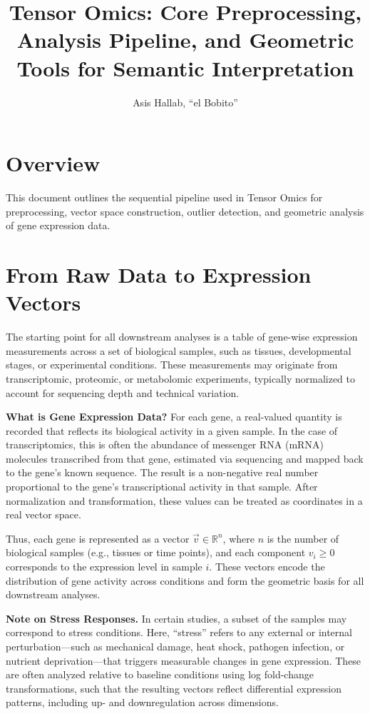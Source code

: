\documentclass{article}
\title{Tensor Omics: Core Preprocessing, Analysis Pipeline, and Geometric Tools
  for Semantic Interpretation}
\author{Asis Hallab, ``el Bobito''}
\begin{document}
\maketitle

\section{Overview}
This document outlines the sequential pipeline used in Tensor Omics for preprocessing, vector space construction, outlier detection, and geometric analysis of gene expression data.

\section{From Raw Data to Expression Vectors}

The starting point for all downstream analyses is a table of gene-wise expression measurements across a set of biological samples, such as tissues, developmental stages, or experimental conditions. These measurements may originate from transcriptomic, proteomic, or metabolomic experiments, typically normalized to account for sequencing depth and technical variation.

\noindent\textbf{What is Gene Expression Data?} For each gene, a real-valued quantity is recorded that reflects its biological activity in a given sample. In the case of transcriptomics, this is often the abundance of messenger RNA (mRNA) molecules transcribed from that gene, estimated via sequencing and mapped back to the gene's known sequence. The result is a non-negative real number proportional to the gene's transcriptional activity in that sample. After normalization and transformation, these values can be treated as coordinates in a real vector space.

Thus, each gene is represented as a vector \( \vec{v} \in \mathbb{R}^n \), where \( n \) is the number of biological samples (e.g., tissues or time points), and each component \( v_i \geq 0 \) corresponds to the expression level in sample \( i \). These vectors encode the distribution of gene activity across conditions and form the geometric basis for all downstream analyses.

\noindent\textbf{Note on Stress Responses.} In certain studies, a subset of the samples may correspond to stress conditions. Here, “stress” refers to any external or internal perturbation—such as mechanical damage, heat shock, pathogen infection, or nutrient deprivation—that triggers measurable changes in gene expression. These are often analyzed relative to baseline conditions using log fold-change transformations, such that the resulting vectors reflect differential expression patterns, including up- and downregulation across dimensions.
\end{document}
